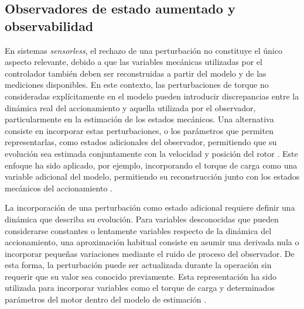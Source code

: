 \subsection{Observadores de estado aumentado y observabilidad}


En sistemas \textit{sensorless}, el rechazo de una perturbación no constituye el único aspecto relevante, debido a que las variables mecánicas utilizadas por el controlador también deben ser reconstruidas a partir del modelo y de las mediciones disponibles. En este contexto, las perturbaciones de torque no consideradas explícitamente en el modelo pueden introducir discrepancias entre la dinámica real del accionamiento y aquella utilizada por el observador, particularmente en la estimación de los estados mecánicos. Una alternativa consiste en incorporar estas perturbaciones, o los parámetros que permiten representarlas, como estados adicionales del observador, permitiendo que su evolución sea estimada conjuntamente con la velocidad y posición del rotor \cite{janiszewskiExtendedKalmanFilter,horvathPositionSensorlessExtended2024}. Este enfoque ha sido aplicado, por ejemplo, incorporando el torque de carga como una variable adicional del modelo, permitiendo su reconstrucción junto con los estados mecánicos del accionamiento \cite{janiszewskiExtendedKalmanFilter}.



La incorporación de una perturbación como estado adicional requiere definir una dinámica que describa su evolución. Para variables desconocidas que pueden considerarse constantes o lentamente variables respecto de la dinámica del accionamiento, una aproximación habitual consiste en asumir una derivada nula o incorporar pequeñas variaciones mediante el ruido de proceso del observador. De esta forma, la perturbación puede ser actualizada durante la operación sin requerir que su valor sea conocido previamente. Esta representación ha sido utilizada para incorporar variables como el torque de carga y determinados parámetros del motor dentro del modelo de estimación \cite{janiszewskiExtendedKalmanFilter,horvathPositionSensorlessExtended2024}.



